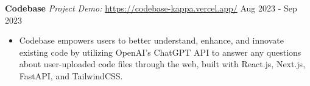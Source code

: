 \documentclass[a4paper,10pt]{extarticle}
\begin{document}
\noindent
\textbf{Codebase} %
\textit{Project Demo:} \url{https://codebase-kappa.vercel.app/} \hfill Aug 2023 - Sep 2023 %
\begin{itemize}
    \item Codebase empowers users to better understand, enhance, and innovate existing code by utilizing OpenAI's ChatGPT API to answer any questions about user-uploaded code files through the web, built with React.js, Next.js, FastAPI, and TailwindCSS. %
  \end{itemize}

\end{document}

